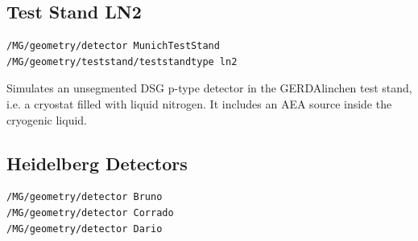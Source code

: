 \subsection{Test Stand LN2}
\begin{lstlisting}
/MG/geometry/detector MunichTestStand
/MG/geometry/teststand/teststandtype ln2
\end{lstlisting}

Simulates an unsegmented DSG p-type detector in the GERDAlinchen test
stand, i.e. a cryostat filled with liquid nitrogen. It includes an AEA
source inside the cryogenic liquid. 

\subsection{Heidelberg Detectors}
\begin{lstlisting}
/MG/geometry/detector Bruno
/MG/geometry/detector Corrado
/MG/geometry/detector Dario
\end{lstlisting}

